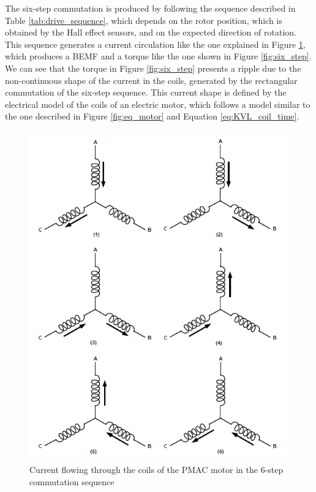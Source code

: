 The six-step commutation is produced by following the sequence described in Table \ref{tab:drive_sequence}, which depends on the rotor position, which is obtained by the Hall effect sensors, and on the expected direction of rotation. This sequence generates a current circulation like the one explained in Figure \ref{fig:six_step_coils}, which produces a \ac{BEMF} and a torque like the one shown in Figure \ref{fig:six_step}. We can see that the torque in Figure \ref{fig:six_step} presents a ripple due to the non-continuous shape of the current in the coils, generated by the rectangular commutation of the six-step sequence. This current shape is defined by the electrical model of the coils of an electric motor, which follows a model similar to the one described in Figure \ref{fig:eq_motor} and Equation \ref{eq:KVL_coil_time}.

\begin{figure}[htbp]
\centering
\includegraphics[width=\textwidth]{Images/6step_coils.png} 
\caption[Six Step Commutation Currents]{Current flowing through the coils of the PMAC motor in the 6-step commutation sequence}
\label{fig:six_step_coils}
\end{figure}

